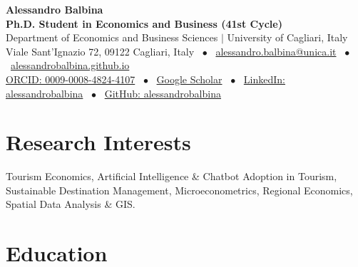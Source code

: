 \documentclass[10pt,a4paper]{article}
\begin{document}
\begin{center}
    {\Huge \textbf{\color{primary}Alessandro Balbina}} \\[3pt]
    {\large \textbf{Ph.D. Student in Economics and Business (41st Cycle)}} \\[2pt]
    {\color{subtext} Department of Economics and Business Sciences $|$ University of Cagliari, Italy} \\[3pt]
    \small
    Viale Sant'Ignazio 72, 09122 Cagliari, Italy \ $\bullet$ \ 
    \href{mailto:alessandro.balbina@unica.it}{\color{secondary}alessandro.balbina@unica.it} \ $\bullet$ \ 
    \href{https://alessandrobalbina.github.io/}{\color{secondary}alessandrobalbina.github.io} \\[2pt]
    \href{https://orcid.org/0009-0008-4824-4107}{\color{secondary}ORCID: 0009-0008-4824-4107} \ $\bullet$ \ 
    \href{https://scholar.google.com/citations?user=_nKG67gAAAAJ&hl=it}{\color{secondary}Google Scholar} \ $\bullet$ \ 
    \href{https://www.linkedin.com/in/alessandrobalbina/}{\color{secondary}LinkedIn: alessandrobalbina} \ $\bullet$ \ 
    \href{https://github.com/alessandrobalbina}{\color{secondary}GitHub: alessandrobalbina}
\end{center}

\vspace{-4pt}

\section{Research Interests}
Tourism Economics, Artificial Intelligence \& Chatbot Adoption in Tourism, Sustainable Destination Management, Microeconometrics, Regional Economics, Spatial Data Analysis \& GIS.

\section{Education}
\end{document}
